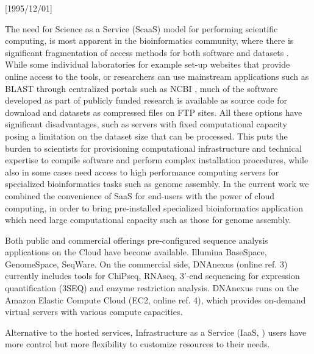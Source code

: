 \NeedsTeXFormat{LaTeX2e}[1995/12/01] \documentclass[10pt]{bmc_article}
\newenvironment{bmcformat}{\begin{raggedright}\baselineskip20pt\sloppy\setboolean{publ}{false}}{\end{raggedright}\baselineskip20pt\sloppy}
\begin{document}
\begin{bmcformat}
The need for Science as a Service (ScaaS) model for performing scientific computing, is most apparent in the 
bioinformatics community, where there is significant fragmentation of access methods for both software and datasets 
\cite{stein}. While some individual laboratories for example set-up websites that provide online access to the 
tools, or researchers can use mainstream applications such as BLAST \cite{altchul} through centralized portals
such as NCBI \cite{}, much of the software developed as part of publicly funded research is available as source 
code for download and datasets as compressed files on FTP sites. All these options have significant disadvantages,  
such as servers with fixed computational capacity posing a limitation on the dataset size that can be processed. 
This puts the burden to scientists for provisioning computational infrastructure and technical expertise to compile
software and perform complex installation procedures, while also in some cases need access to high performance computing 
servers for specialized bioinformatics tasks such as genome assembly. In the current work we combined the convenience 
of SaaS for end-users with the power of cloud computing, in order to bring pre-installed specialized bioinformatics application 
which need large computational capacity such as those for genome assembly.


Both public and commercial offerings pre-configured sequence analysis applications on
the Cloud have become available. Illumina BaseSpace, GenomeSpace, SeqWare. On the commercial side, 
DNAnexus (online ref.  3) currently includes tools
for ChiPseq, RNAseq, 3'-end sequencing for expression quantification (3SEQ) and enzyme restriction analysis.
DNAnexus runs on the Amazon Elastic Compute Cloud (EC2, online ref. 4), which provides on-demand virtual
servers with various compute capacities. 

Alternative to the hosted services, Infrastructure as a Service (IaaS, \cite{}) users have more control but more flexibility 
to customize resources to their needs.


\end{bmcformat}
\end{document}
